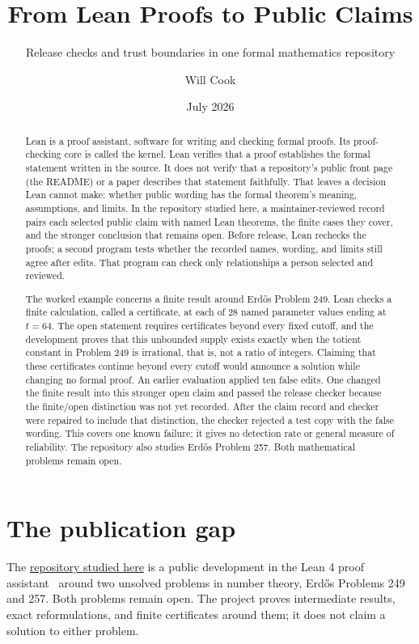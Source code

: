 \documentclass[11pt]{article}
\title{From Lean Proofs to Public Claims}
\subtitle{Release checks and trust boundaries in one formal mathematics repository}
\author{Will Cook}
\date{July 2026}
\newcommand{\repobase}{https://github.com/wcook04/plectis-lean-erdos249-257}
\begin{document}
\maketitle

\begin{abstract}
Lean is a proof assistant, software for writing and checking formal proofs.
Its proof-checking core is called the kernel.  Lean verifies that a proof
establishes the formal statement written in the source.  It does not verify
that a repository's public front page (the README) or a paper describes that
statement faithfully.
That leaves a decision Lean cannot make: whether public wording has the formal
theorem's meaning, assumptions, and limits.  In the repository studied here, a
maintainer-reviewed record pairs each selected public claim with named Lean
theorems, the finite cases they cover, and the stronger conclusion that remains
open.  Before release, Lean rechecks the proofs; a second program tests whether
the recorded names, wording, and limits still agree after edits.  That program
can check only relationships a person selected and reviewed.

The worked example concerns a finite result around Erd\H{o}s Problem 249.
Lean checks a finite calculation, called a certificate, at each of 28 named
parameter values ending at \(t=64\).  The open statement requires certificates beyond
every fixed cutoff, and the development proves that this unbounded supply
exists exactly when the totient constant in Problem 249 is irrational, that is,
not a ratio of integers.  Claiming that these
certificates continue beyond every cutoff would announce a solution while
changing no formal proof.  An earlier evaluation applied ten false edits.  One
changed the finite result into this stronger open claim and passed the release
checker because the finite/open distinction was not yet recorded.  After the
claim record and checker were repaired to include that distinction, the
checker rejected a test copy with the false wording.  This
covers one known failure; it gives no detection rate or general measure of
reliability.  The repository also studies Erd\H{o}s Problem 257.  Both
mathematical problems remain open.
\end{abstract}

\section{The publication gap}\label{sec:gap}

The \href{\repobase}{repository studied here}
is a public development in the Lean 4 proof assistant~\cite{lean4} around two
unsolved problems in number theory,
Erd\H{o}s Problems 249 and 257.  Both problems remain open.  The project
proves intermediate results, exact reformulations, and finite certificates
around them; it does not claim a solution to either problem.
\end{document}
